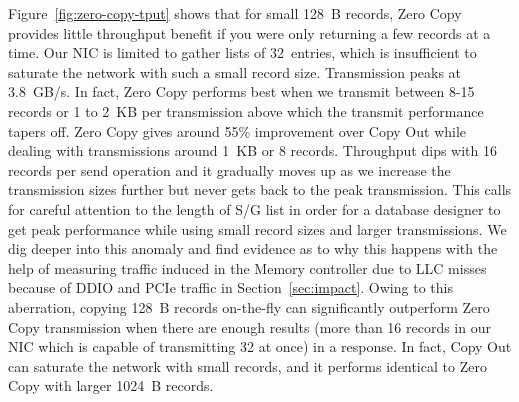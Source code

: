 
Figure~\ref{fig:zero-copy-tput} shows that for small 128~B records, Zero Copy
provides little throughput benefit if you were only returning a few records 
at a time. Our NIC is limited to gather lists
of 32~entries, which is insufficient to saturate the network with such a small
record size. Transmission peaks at 3.8~GB/s. In fact, Zero Copy performs best when
we transmit between 8-15 records or 1 to 2~KB per transmission above which the transmit performance 
tapers off. Zero Copy gives around 55\% improvement over Copy Out while dealing 
with transmissions around 1~KB or 8 records. Throughput dips with 16 records per send operation and it gradually moves up as we 
increase the transmission sizes further but never gets back to the peak transmission. This calls 
for careful attention to the length of S/G list in order for a database designer to get peak performance while using small record sizes and larger 
transmissions. We dig deeper into this anomaly and find evidence as to why this happens with the 
help of measuring traffic induced in the Memory controller due to LLC misses because of DDIO and 
PCIe traffic in Section~\ref{sec:impact}. Owing to this aberration, copying 128~B records 
on-the-fly can significantly outperform Zero Copy transmission when there are 
enough results (more than 16 records in our NIC which is capable of transmitting 32 at once) 
in a response. In fact, Copy Out can saturate the network with small records, and it
performs identical to Zero Copy with larger 1024~B records.
\newline


